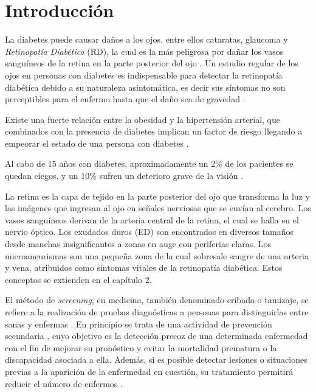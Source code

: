 \newpage{\ } 
\thispagestyle{empty} 

\chapter{Introducción}


La diabetes puede causar daños a los ojos, entre ellos cataratas, glaucoma y \textit{Retinopatía Diabética} (RD), la cual es la más peligrosa por dañar los vasos sanguíneos de la retina en la parte posterior del ojo \cite{crespo2004prevalencia}. Un estudio regular de los ojos  en personas con diabetes es indispensable para detectar la retinopatía diabética debido a su naturaleza asintomática, es decir sus síntomas no son perceptibles para el enfermo hasta que el daño sea de gravedad \cite{salama2001factores}.

Existe una fuerte  relación entre la obesidad y la hipertensión arterial, que  combinados con la presencia de  diabetes  implican un factor de riesgo llegando a empeorar el estado de una persona con diabetes \cite{villanueva1996analisis}.

Al cabo de 15 años con diabetes, aproximadamente un 2\% de los pacientes se quedan ciegos, y un 10\% sufren un deterioro grave de la visión \cite{resnikoff2004global}.


La retina es la capa de tejido en la parte posterior del ojo que transforma la luz y las imágenes que ingresan al ojo en señales nerviosas que se envían al cerebro. Los vasos sanguíneos derivan de la arteria central de la retina, el cual se halla en el nervio óptico. Los exudados duros (ED) son encontrados en diversos tamaños desde manchas insignificantes a zonas en auge con periferias claras. Los microaneurismas son una pequeña zona de la cual sobresale sangre de una arteria y vena, atribuidos como síntomas vitales de la retinopatía diabética. Estos conceptos se extienden en el capítulo 2.


El método de \textit{screening}, en medicina, también denominado cribado o tamizaje, se refiere a la realización de pruebas diagnósticas a personas para distinguirlas entre sanas y enfermas \cite{mozur2003sistemas}. En principio se trata de una actividad de prevención secundaria \cite{de2002documento}, cuyo objetivo es la detección precoz de una determinada enfermedad con el fin de mejorar su pronóstico y evitar la mortalidad prematura o la discapacidad asociada a ella. Además, si es posible detectar lesiones o situaciones previas a la aparición de la enfermedad en cuestión, su tratamiento permitirá reducir el número de enfermos \cite{elizaga2013apoyo}.

